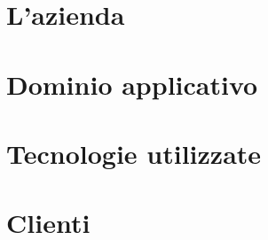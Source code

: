 \section{L'azienda}

\section{Dominio applicativo}

\section{Tecnologie utilizzate}

\section{Clienti}



